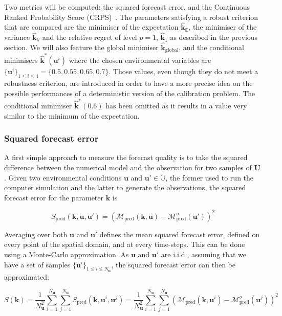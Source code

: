 \documentclass[preprint, 1p]{elsarticle}
\newcommand{\Ex}{\mathbb{E}}
\newcommand{\hatkmean}{\hat{\mathbf{k}}_{\Ex}}
\newcommand{\hatkvar}{\hat{\mathbf{k}}_{\mathbb{V}}}
\newcommand{\kest}{\hat{\mathbf{k}}}
\newcommand{\Uspace}{\mathbb{U}}
\begin{document}
Two metrics will be computed: the squared forecast error, and the Continuous Ranked Probability Score (CRPS)~\citep{gneiting_probabilistic_2014}. The parameters satisfying a robust criterion that are compared are the minimiser of the expectation $\hatkmean$, the minimiser of the variance $\hatkvar$ and the relative regret of level $p=1$, $\kest_1$ as described in the previous section.
We will also feature the global minimiser $\kest_{\mathrm{global}}$, and the conditional minimisers $\kest^*(\mathbf{u}^i)$ where the chosen environmental variables are $\{\mathbf{u}^i\}_{1\leq i \leq 4} = \{0.5, 0.55, 0.65, 0.7\}$. Those values, even though they do not meet a robustness criterion, are introduced in order to have a more precise idea on the possible performances of a deterministic version of the calibration problem.
The conditional minimiser $\kest^*(0.6)$ has been omitted as it results in a value very similar to the minimum of the expectation.

\subsubsection{Squared forecast error}
A first simple approach to measure the forecast quality is to take the squared difference between the numerical model and the observation for two samples of $\mathbf{U}$.
Given two environmental conditions $\mathbf{u}$ and $\mathbf{u}'\in \Uspace$, the former used to run the computer simulation and the latter to generate the observations, the squared forecast error for the parameter $\mathbf{k}$ is

\begin{equation}
\label{eq:squared_forecast_error}
S_{\mathrm{pred}}(\mathbf{k},\mathbf{u},\mathbf{u}') = \left(\mathcal{M}_{\mathrm{pred}}(\mathbf{k},\mathbf{u}) - \mathcal{M}^{o}_{\mathrm{pred}}(\mathbf{u}')\right)^2
\end{equation}

Averaging over both $\mathbf{u}$ and $\mathbf{u}'$ defines the mean squared forecast error, defined on every point of the spatial domain, and at every time-steps. This can be done using a Monte-Carlo approximation. As $\mathbf{u}$ and $\mathbf{u}'$ are i.i.d., assuming that we have a set of samples $\{\mathbf{u}^i\}_{1\leq i \leq N_{\mathbf{u}}}$, the squared forecast error can then be approximated:

\begin{equation}
  \label{eq:squared_forecast_error_averaged}
  S(\mathbf{k}) = \frac{1}{N_{\mathbf{u}}^2 }\sum_{i=1}^{N_{\mathbf{u}}}\sum_{j=1}^{N_{\mathbf{u}}} S_{\mathrm{pred}}(\mathbf{k},\mathbf{u}^i,\mathbf{u}^j) = \frac{1}{N_{\mathbf{u}}^2 }\sum_{i=1}^{N_{\mathbf{u}}}\sum_{j=1}^{N_{\mathbf{u}}}  \left(\mathcal{M}_{\mathrm{pred}}(\mathbf{k},\mathbf{u}^i) - \mathcal{M}^{o}_{\mathrm{pred}}(\mathbf{u}^j)\right)^2
\end{equation}
\end{document}
